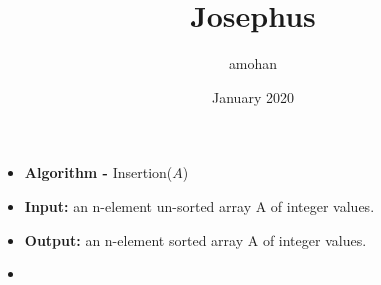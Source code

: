 \documentclass{article}
\title{Josephus}
\author{amohan }
\date{January 2020}
\begin{document}
\begin{itemize}
\item[]
\footnotesize{\textbf{Algorithm - }Insertion($A$)}\\
\item[]
\footnotesize{\textbf{Input:} an n-element un-sorted array A of integer values.}
\item[]
\footnotesize{\textbf{Output:} an n-element sorted array A of integer values.} 

\item[]
\end{itemize}
\end{document}
